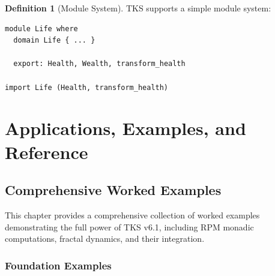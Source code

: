 \documentclass[11pt,twoside,openright]{book}
\theoremstyle{definition}
\newtheorem{definition}{Definition}[chapter]
\theoremstyle{plain}
\theoremstyle{remark}
\begin{document}
\begin{definition}[Module System]
\label{def:modules}
TKS supports a simple module system:
\begin{verbatim}
module Life where
  domain Life { ... }

  export: Health, Wealth, transform_health

import Life (Health, transform_health)
\end{verbatim}
\end{definition}


\part{Applications, Examples, and Reference}

\chapter{Comprehensive Worked Examples}
\label{ch:examples}

This chapter provides a comprehensive collection of worked examples demonstrating the full power of TKS v6.1, including RPM monadic computations, fractal dynamics, and their integration.

\section{Foundation Examples}
\end{document}
